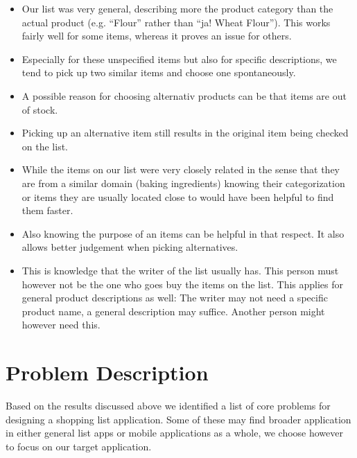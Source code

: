 \documentclass{scrartcl}
\begin{document}
      \begin{itemize}
        \item Our list was very general, describing more the product category than the actual product (e.g. ``Flour'' rather than ``ja! Wheat Flour''). 
          This works fairly well for some items, whereas it proves an issue for others.
        \item Especially for these unspecified items but also for specific descriptions, we tend to pick up two similar items and choose one spontaneously.
        \item A possible reason for choosing alternativ products can be that items are out of stock.
        \item Picking up an alternative item still results in the original item being checked on the list.
        \item While the items on our list were very closely related in the sense that they are from a similar domain (baking ingredients) knowing their categorization or items they are usually located close to would have been helpful to find them faster.
        \item Also knowing the purpose of an items can be helpful in that respect. It also allows better judgement when picking alternatives.
        \item This is knowledge that the writer of the list usually has. This person must however not be the one who goes buy the items on the list.
          This applies for general product descriptions as well: The writer may not need a specific product name, a general description may suffice. 
          Another person might however need this.
      \end{itemize}

\section{Problem Description}
\label{sec:problem}
Based on the results discussed above we identified a list of core problems for designing a shopping list application.
Some of these may find broader application in either general list apps or mobile applications as a whole, we choose however to focus on our target application.
\end{document}
